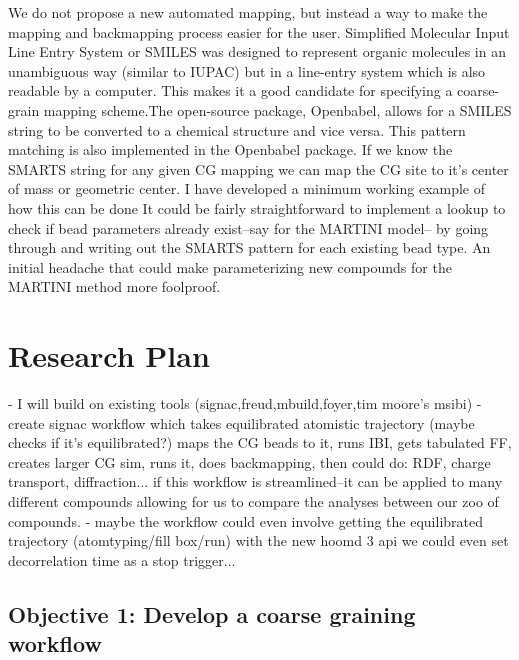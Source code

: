 We do not propose a new automated mapping, but instead a way to make the mapping and backmapping process easier for the user.
Simplified Molecular Input Line Entry System or SMILES \cite{Weininger} was designed to represent organic molecules in an unambiguous way (similar to IUPAC) but in a line-entry system which is also readable by a computer.
This makes it a good candidate for specifying a coarse-grain mapping scheme.The open-source package, Openbabel, allows for a SMILES string to be converted to a chemical structure and vice versa.
This pattern matching is also implemented in the Openbabel package.
If we know the SMARTS string for any given CG mapping we can map the CG site to it's center of mass or geometric center.
I have developed a minimum working example of how this can be done %
It could be fairly straightforward to implement a lookup to check if bead parameters already exist--say for the MARTINI model-- by going through and writing out the SMARTS pattern for each existing bead type.
An initial headache that could make parameterizing new compounds for the MARTINI method more foolproof.

\section*{Research Plan}

- I will build on existing tools (signac,freud,mbuild,foyer,tim moore's msibi)
- create signac workflow which takes equilibrated atomistic trajectory (maybe checks if it's equilibrated?) maps the CG beads to it, runs IBI, gets tabulated FF, creates larger CG sim, runs it, does backmapping, then could do: RDF, charge transport, diffraction...
if this workflow is streamlined--it can be applied to many different compounds allowing for us to compare the analyses between our zoo of compounds.
- maybe the workflow could even involve getting the equilibrated trajectory (atomtyping/fill box/run) with the new hoomd 3 api we could even set decorrelation time as a stop trigger...

\subsection*{Objective 1: Develop a coarse graining workflow}

